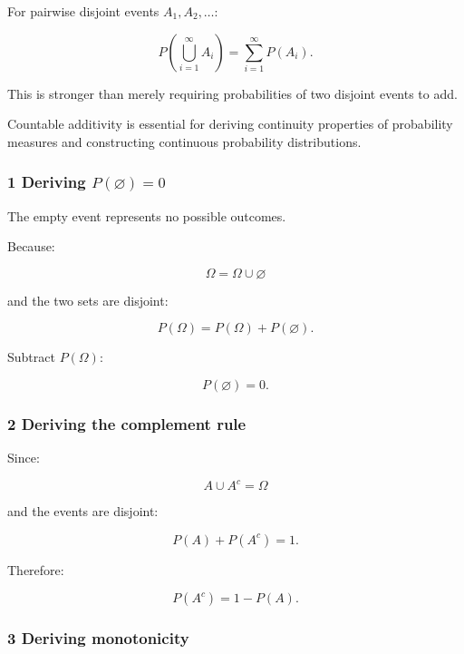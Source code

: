 \hypertarget{02-foundations-ii-ch023-axiom-3-countable-additivity}{}

For pairwise disjoint events \(A_1,A_2,\ldots\):

\[
 \boxed{ P\left(\bigcup_{i=1}^{\infty}A_i\right) = \sum_{i=1}^{\infty}P(A_i) }.
\]

This is stronger than merely requiring probabilities of two disjoint events to add.

Countable additivity is essential for deriving continuity properties of probability measures and constructing continuous probability distributions.

\subsubsection{\texorpdfstring{1 Deriving \(P(\varnothing)=0\)}{1 Deriving P(\textbackslash varnothing)=0}}\label{02-foundations-ii-ch023-deriving-pvarnothing0}

\hypertarget{02-foundations-ii-ch023-deriving-pvarnothing0}{}

The empty event represents no possible outcomes.

Because:

\[
 \Omega=\Omega\cup\varnothing
\]

and the two sets are disjoint:

\[
 P(\Omega)=P(\Omega)+P(\varnothing).
\]

Subtract \(P(\Omega)\):

\[
 \boxed{P(\varnothing)=0}.
\]

\subsubsection{2 Deriving the complement rule}\label{02-foundations-ii-ch023-deriving-the-complement-rule}

\hypertarget{02-foundations-ii-ch023-deriving-the-complement-rule}{}

Since:

\[
 A\cup A^c=\Omega
\]

and the events are disjoint:

\[
 P(A)+P(A^c)=1.
\]

Therefore:

\[
 \boxed{P(A^c)=1-P(A)}.
\]

\subsubsection{3 Deriving monotonicity}\label{02-foundations-ii-ch023-deriving-monotonicity}

